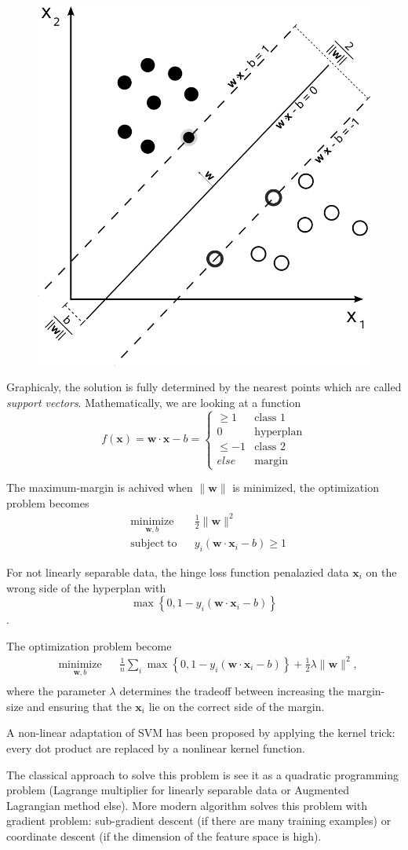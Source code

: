 \documentclass[twocolumn]{article}
\numberwithin{equation}{section}
\begin{document}
\begin{figure}[H]
	\centering
	\includegraphics[width=.2\textwidth]{Svm_max_sep_hyperplane_with_margin.png}
\end{figure}
Graphicaly, the solution is fully determined by the nearest points which are called \textit{support vectors}.
Mathematically, we are looking at a function 
$$f(\mathbf{x})=\mathbf{w}\cdot\mathbf{x} - b = \left\{
  \begin{array}{lr}
    \ge 1 	& \text{class 1}\\
    0  		& \text{hyperplan} \\
    \le -1 	& \text{class 2}\\
    else    & \text{margin}
  \end{array}
\right.$$

The maximum-margin is achived when $\|\mathbf{w}\|$ is minimized, the optimization problem becomes
\begin{align*}
&\underset{\mathbf{w},b}{\operatorname{minimize}}& & \frac{1}{2}\|\mathbf{w}\|^2 \\
&\operatorname{subject\;to}
& &y_i(\mathbf{w}\cdot\mathbf{x}_i - b) \ge 1 
\end{align*}

For not linearly separable data, the hinge loss function penalazied data $\mathbf{x}_i$ on the wrong side of the hyperplan with
$$\max \left\{ 0,1-y_{i}( \mathbf{w}\cdot \mathbf{x}_i  -b) \right\}$$.

The optimization problem become 
\begin{align*}
&\underset{\mathbf{w},b}{\operatorname{minimize}}& &  \frac{1}{n} \sum_i \max \left\{ 0,1-y_{i}( \mathbf{w}\cdot \mathbf{x}_i  -b) \right\}  + \frac{1}{2} \lambda \|\mathbf{w}\|^2, \\
\end{align*}
where the parameter $\lambda$ determines the tradeoff between increasing the margin-size and ensuring that the $\mathbf{x}_i$ lie on the correct side of the margin.

A non-linear adaptation of SVM has been proposed by applying the kernel trick:  every dot product are replaced by a nonlinear kernel function.

The classical approach to solve this problem is see it as a quadratic programming problem (Lagrange multiplier for linearly separable data or Augmented Lagrangian method else). More modern algorithm solves this problem with gradient problem: sub-gradient descent (if there are many training examples) or coordinate descent (if the dimension of the feature space is high).
\end{document}
